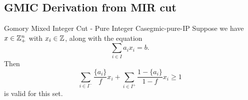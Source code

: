 
\subsection{GMIC Derivation from MIR cut}
\begin{theorem}{Gomory Mixed Integer Cut - Pure Integer Case}{gmic-pure-IP}
Suppose we have $x \in {\mathbb{Z}}^n_+$ with $x_i \in {\mathbb{Z}}$, along with the equation
\begin{equation}
\sum_{i \in I} a_{i}x_{i} = b.
\end{equation}
Then
\begin{equation}
\label{eq:gmic}
\sum_{i \in I^{-}} \frac{\{a_i\}}{f} x_i + \sum_{i \in I^+} \frac{1-\{a_i\}}{1-f}x_i \geq 1
\end{equation}
is valid for this set.
\end{theorem}


